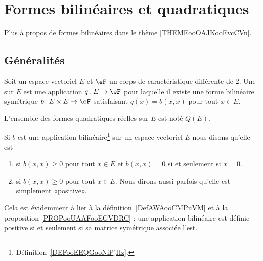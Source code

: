 \section{Formes bilinéaires et quadratiques}

Plus à propos de formes bilinéaires dans le thème \ref{THEMEooOAJKooEvcCVn}.

\subsection{Généralités}

\begin{definition}   \label{DefBSIoouvuKR}
	Soit un espace vectoriel \( E\) et \( \eF\) un corps de caractéristique différente de \( 2\). Une  sur \( E\) est une application \( q\colon E\to \eF\) pour laquelle il existe une forme bilinéaire symétrique \( b\colon E\times E\to \eF\) satisfaisant \( q(x)=b(x,x)\) pour tout \( x\in E\).

	L'ensemble des formes quadratiques réelles sur \( E\) est noté \( Q(E)\).
\end{definition}

\begin{definition}      \label{DEFooJIAQooZkBtTy}
	Si $b$ est une application bilinéaire\footnote{Définition~\ref{DEFooEEQGooNiPjHz}.} sur un espace vectoriel \( E\) nous disons qu'elle est
	\begin{enumerate}
		\item
		       si $b(x,x)\geq 0$ pour tout $x\in E$ et $b(x,x)=0$ si et seulement si $x=0$.
		\item
		       si $b(x,x)\geq 0$ pour tout $x\in E$. Nous dirons aussi parfois qu'elle est simplement «positive».
	\end{enumerate}
\end{definition}
Cela est évidemment à lier à la définition~\ref{DefAWAooCMPuVM} et à la proposition \ref{PROPooUAAFooEGVDRC} : une application bilinéaire est définie positive si et seulement si sa matrice symétrique associée l'est.

